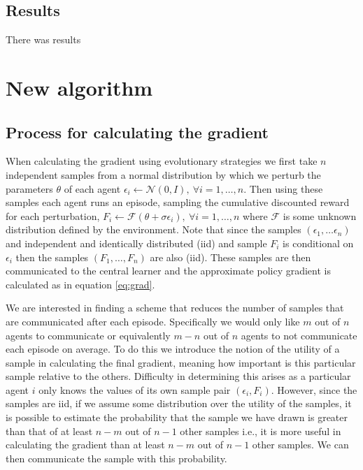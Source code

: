 \subsection{Results}
There was results

\section{New algorithm}
\subsection{Process for calculating the gradient}
When calculating the gradient using evolutionary strategies we first take $n$ independent samples from a normal distribution by which we perturb the parameters $\theta$ of each agent $\epsilon_i \leftarrow \mathcal{N}(0,I), \ \forall i=1,\dots,n$. Then using these samples each agent runs an episode, sampling the cumulative discounted reward for each perturbation, $F_i \leftarrow \mathcal{F}(\theta+\sigma \epsilon_i), \ \forall i=1,\dots,n$ where $\mathcal{F}$ is some unknown distribution defined by the environment. Note that since the samples $(\epsilon_1,\dots\epsilon_n)$ and independent and identically distributed (iid) and sample $F_i$ is conditional on $\epsilon_i$ then the samples $(F_1,\dots,F_n)$ are also (iid). These samples are then communicated to the central learner and the approximate policy gradient is calculated as in equation \ref{eq:grad}.

We are interested in finding a scheme that reduces the number of samples that are communicated after each episode. Specifically we would only like $m$ out of $n$ agents to communicate or equivalently $m-n$ out of $n$ agents to not communicate each episode on average. To do this we introduce the notion of the utility of a sample in calculating the final gradient, meaning how important is this particular sample relative to the others. Difficulty in determining this arises as a particular agent $i$ only knows the values of its own sample pair $(\epsilon_i, F_i)$. However, since the samples are iid, if we assume some distribution over the utility of the samples, it is possible to estimate the probability that the sample we have drawn is greater than that of at least $n-m$ out of $n-1$ other samples i.e., it is more useful in calculating the gradient than at least $n-m$ out of $n-1$ other samples. We can then communicate the sample with this probability.

